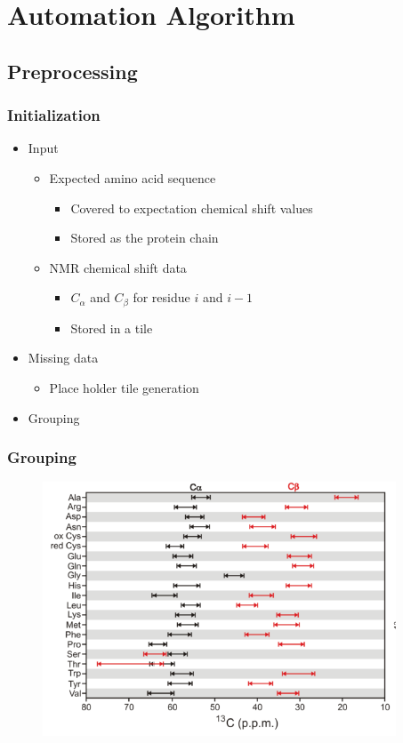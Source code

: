 \documentclass{beamer}
\begin{document}
\section{Automation Algorithm}

\subsection{Preprocessing}

\begin{frame}
	\frametitle{Initialization}
	\begin{itemize}
		\item Input
		\begin{itemize}
			\item Expected amino acid sequence
			\begin{itemize}
				\item Covered to expectation chemical shift values
				\item Stored as the protein chain
			\end{itemize}
			\item NMR chemical shift data
			\begin{itemize}
				\item $C_\alpha$ and $C_{\beta}$ for residue $i$ and $i-1$
				\item Stored in a tile
			\end{itemize}
		\end{itemize}
		\item Missing data
		\begin{itemize}
			\item Place holder tile generation
		\end{itemize}
		\item Grouping 
	\end{itemize}
\end{frame}

\begin{frame}
	\frametitle{Grouping}
	\begin{figure}[H]
	\begin{center}
	\includegraphics[width=.65\textwidth]{carbon}
	\end{center}
	\end{figure}
\hfill \scriptsize\cite{carbon}
\end{frame}
\end{document}
